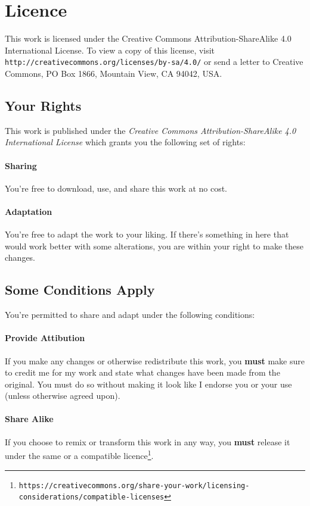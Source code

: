 \documentclass[a4paper]{book}
\begin{document}
\section*{Licence}
This work is licensed under the Creative Commons Attribution-ShareAlike 4.0 International License.
To view a copy of this license, visit \texttt{http://creativecommons.org/licenses/by-sa/4.0/} or send a letter to Creative Commons, PO Box 1866, Mountain View, CA 94042, USA.

\subsection*{Your Rights}
This work is published under the \textit{Creative Commons Attribution-ShareAlike 4.0 International License} which grants you the following set of rights:
\paragraph{Sharing} You're free to download, use, and share this work at no cost.
\paragraph{Adaptation} You're free to adapt the work to your liking. 
If there's something in here that would work better with some alterations, you are within your right to make these changes.

\subsection*{Some Conditions Apply}
You're permitted to share and adapt under the following conditions:
\paragraph{Provide Attibution} If you make any changes or otherwise redistribute this work, you \textbf{must} make sure to credit me for my work and state what changes have been made from the original.
You must do so without making it look like I endorse you or your use (unless otherwise agreed upon).
\paragraph{Share Alike} If you choose to remix or transform this work in any way, you \textbf{must} release it under the same or a compatible licence\footnote{\texttt{https://creativecommons.org/share-your-work/licensing-considerations/compatible-licenses}}.

\tableofcontents
\mainmatter %











\appendix

\end{document}
